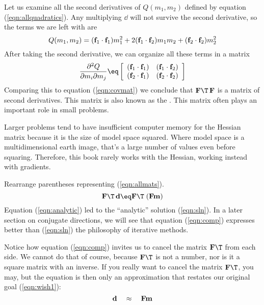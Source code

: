 \par
Let us examine all the second derivatives of $Q(m_1,m_2)$ defined by equation (\ref{eqn:allquadratics}).
Any multiplying $\dd$ will not survive the second derivative, so the terms we are left with are
\begin{equation}
Q(m_1,m_2) = ({\bf f}_1\cdot{\bf f}_1) m_1^2 +
           2 ({\bf f}_1\cdot{\bf f}_2) m_1 m_2 +
             ({\bf f}_2\cdot{\bf f}_2) m_2^2
\end{equation}
After taking the second derivative, we can organize all these terms in a matrix
\begin{equation}
\frac{\partial^2 Q}{\partial m_i\partial m_j} \eq
        \left[
                \begin{array}{cc}
                        (\ff_1\cdot  \ff_1) &  (\ff_1 \cdot \ff_2)   \\
                        (\ff_2\cdot  \ff_1) &  (\ff_2 \cdot \ff_2)  
                \end{array}
        \right]
\end{equation}
Comparing this to equation (\ref{eqn:covmat}) we conclude
that $\bold F\T\,\bold F$ is a matrix of second derivatives.
This matrix is also known as the
.
This matrix often plays an important role in small problems.

\par
Larger problems tend to have insufficient computer memory for the Hessian matrix
because it is the size of model space squared.
Where model space is a multidimensional earth image,
that's a large number of values even before squaring.
Therefore, this book rarely works with the Hessian,
working instead with gradients.
\par
Rearrange parentheses representing (\ref{eqn:allmats}).
\begin{equation}
\bold F\T\,\dd \eq  \bold F\T \; (\bold F   \bold m )
\label{eqn:comp}
\end{equation}
Equation
(\ref{eqn:analytic})
led to the ``analytic'' solution (\ref{eqn:sln}).
In a later section on conjugate directions,
we will see that equation
(\ref{eqn:comp})
expresses better than
(\ref{eqn:sln})
the philosophy of iterative methods.

\par
Notice how equation
(\ref{eqn:comp})
invites us to cancel the matrix
$\bold F\T$
from each side.
We cannot do that of course, because
$\bold F\T$
is not a number, nor is it a square matrix with an inverse.
If you really want to cancel the matrix $\bold F\T$, you may,
but the equation is then only an approximation
that restates our original goal (\ref{eqn:wish1}):
\begin{equation}
{\bf d}  \quad \approx \quad \bold F   \bold m 
\label{eqn:wish2}
\end{equation}

